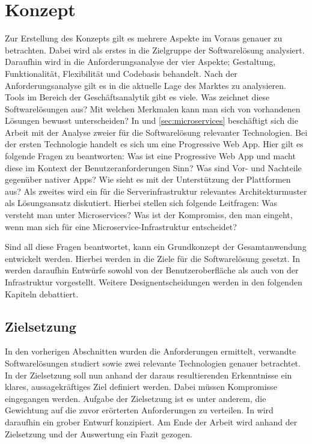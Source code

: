\chapter{Konzept}
\label{chap:konzept}

Zur Erstellung des Konzepts gilt es mehrere Aspekte im Voraus genauer zu betrachten.
Dabei wird als erstes in  die Zielgruppe der Softwarelösung analysiert. Daraufhin
wird in  die Anforderungsanalyse der vier Aspekte; Gestaltung, Funktionalität,
Flexibilität und Codebasis behandelt. Nach der Anforderungsanalyse gilt es
in  die aktuelle Lage
des Marktes zu analysieren. Tools im Bereich der Geschäftsanalytik gibt es viele. \cite{WikiBISoftware}
Was zeichnet diese Softwarelösungen aus? Mit welchen Merkmalen kann man sich von vorhandenen Lösungen
bewusst unterscheiden? In  und \ref{sec:microservices} beschäftigt
sich die Arbeit mit der Analyse zweier für die Softwarelösung relevanter Technologien.
Bei der ersten Technologie handelt es sich um eine Progressive Web App. Hier gilt es folgende
Fragen zu beantworten: Was ist eine Progressive Web App und macht diese 
im Kontext der Benutzeranforderungen Sinn? Was sind Vor- und Nachteile gegenüber nativer Apps?
Wie sieht es mit der Unterstützung der Plattformen aus? Als zweites wird ein für die
Serverinfrastruktur relevantes Architekturmuster als Lösungsansatz diskutiert. Hierbei
stellen sich folgende Leitfragen: Was versteht man unter Microservices? Was ist der Kompromiss,
den man eingeht, wenn man sich für eine Microservice-Infrastruktur entscheidet?

Sind all diese Fragen beantwortet, kann ein Grundkonzept der Gesamtanwendung entwickelt werden.
Hierbei werden in  die Ziele für die Softwarelösung gesetzt. In 
werden daraufhin Entwürfe sowohl von der Benutzeroberfläche als auch von der Infrastruktur vorgestellt.
Weitere Designentscheidungen werden in den folgenden Kapiteln debattiert.

\section{Zielsetzung}
\label{sec:zielsetzung}
In den vorherigen Abschnitten wurden die Anforderungen ermittelt, verwandte Softwarelösungen
studiert sowie zwei relevante Technologien genauer betrachtet. In der Zielsetzung soll nun
anhand der daraus resultierenden Erkenntnisse ein klares, aussagekräftiges Ziel definiert werden.
Dabei müssen Kompromisse eingegangen werden. Aufgabe der Zielsetzung ist es unter anderem,
die Gewichtung auf die zuvor erörterten Anforderungen zu verteilen. In 
wird daraufhin ein grober Entwurf konzipiert. Am Ende der Arbeit wird anhand der Zielsetzung
und der Auswertung ein Fazit gezogen.

